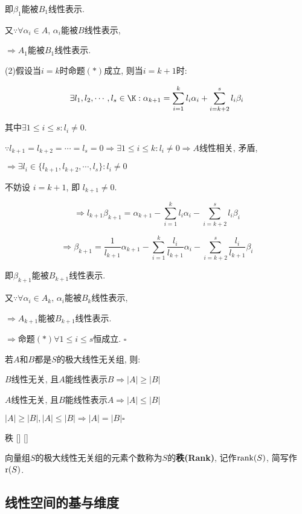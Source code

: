 \documentclass[UTF8]{ctexart}
\begin{document}
\begin{prf}
			即$\beta_{1}$能被$B_{1}$线性表示. 
			
			又$\because \forall \alpha_{i}\in A$, $\alpha_{i}$能被$B$线性表示, 
			
			$\Longrightarrow A_{1}$能被$B_{1}$线性表示. 
			
			(2)假设当$i=k$时命题$(*)$成立, 则当$i=k+1$时: 
			
			$$\exists l_{1},l_{2},\cdots, l_{s}\in \K: \alpha_{k+1}=\sum_{i=1}^{k}l_{i}\alpha_{i}+\sum_{i=k+2}^{s}l_{i}\beta_{i}$$
			
			其中$\exists1\leq i\leq s: l_{i}\neq 0$. 
			
			$\because l_{k+1}=l_{k+2}=\cdots=l_{s}=0\Longrightarrow \exists 1\leq i\leq k: l_{i}\neq 0 \Longrightarrow A$线性相关, 矛盾, 
			
			$\Longrightarrow\exists l_{i}\in \{l_{k+1},l_{k+2},\cdots, l_{s}\} :l_{i}\neq 0$
			
			不妨设 $i=k+1$, 即 $l_{k+1}\neq 0$. 
			
			$$\Longrightarrow l_{k+1}\beta_{k+1}=\alpha_{k+1}-\sum_{i=1}^{k}l_{i}\alpha_{i}-\sum_{i=k+2}^{s}l_{i}\beta_{i}$$
			
			$$\Longrightarrow \beta_{k+1}=\frac{1}{l_{k+1}}\alpha_{k+1}-\sum_{i=1}^{k}\frac{l_i}{l_{k+1}}\alpha_{i}-\sum_{i=k+2}^{s}\frac{l_i}{l_{k+1}}\beta_{i}$$
			
			即$\beta_{k+1}$能被$B_{k+1}$线性表示. 
			
			又$\because \forall \alpha_{i}\in A_{k}$, $\alpha_{i}$能被$B_{k}$线性表示, 
			
			$\Longrightarrow A_{k+1}$能被$B_{k+1}$线性表示. 
			
			$\Longrightarrow$命题$(*)\forall 1\leq i\leq s$恒成立. $\square$
			
			若$A$和$B$都是$S$的极大线性无关组, 则: 
			
			$B$线性无关, 且$A$能线性表示$B \Longrightarrow |A|\geq |B|$
			
			$A$线性无关, 且$B$能线性表示$A \Longrightarrow |A|\leq |B|$
			
			$|A|\geq |B|,|A|\leq |B|\Longrightarrow |A|=|B|\square$
        \end{prf}
			
		\begin{dfn}
			[]
			{秩}
			[]
			[]

			向量组$S$的极大线性无关组的元素个数称为$S$的\textbf{秩(Rank)}, 记作${\rm rank}(S)$, 简写作${\rm r}(S)$. 
		\end{dfn}
	
	\subsection{线性空间的基与维度}
		
\end{document}
